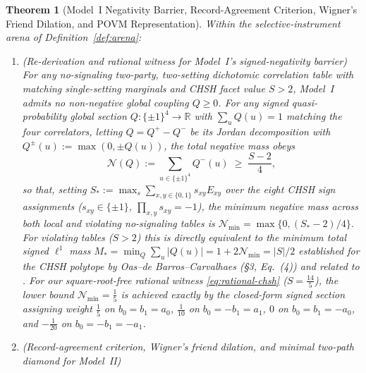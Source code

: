 \documentclass[11pt,a4paper]{article}
\newtheorem{theorem}{Theorem}
\theoremstyle{definition}
\theoremstyle{remark}
\newcommand{\cN}{\mathcal{N}}
\newcommand{\bbR}{\mathbb{R}}
\newcommand{\1}{\mathbf{1}}
\begin{document}
\begin{theorem}[Model~I Negativity Barrier, Record-Agreement Criterion, Wigner's Friend Dilation, and POVM Representation]\label{thm:branching}
Within the selective-instrument arena of Definition~\ref{def:arena}:
\begin{enumerate}
  \item[(a)] \emph{(Re-derivation and rational witness for Model~I's signed-negativity barrier)} For any no-signaling two-party, two-setting dichotomic correlation table with matching single-setting marginals and CHSH facet value $S>2$, Model~I admits no non-negative global coupling $Q\ge 0$. For any signed quasi-probability global section $Q:\{\pm 1\}^4\to\bbR$ with $\sum_u Q(u)=1$ matching the four correlators, letting $Q=Q^+-Q^-$ be its Jordan decomposition with $Q^\pm(u):=\max(0,\pm Q(u))$, the total negative mass obeys
  \begin{equation}\label{eq:negativity-bound}
    \cN(Q) := \sum_{u\in\{\pm 1\}^4} Q^-(u) \;\ge\; \frac{S - 2}{4},
  \end{equation}
  so that, setting $S_* := \max_s \sum_{x,y\in\{0,1\}} s_{xy} E_{xy}$ over the eight CHSH sign assignments ($s_{xy}\in\{\pm 1\}$, $\prod_{x,y}s_{xy}=-1$), the minimum negative mass across both local and violating no-signaling tables is $\cN_{\min} = \max\{0,(S_*-2)/4\}$. For violating tables ($S>2$) this is directly equivalent to the minimum total signed $\ell^1$ mass $M_* = \min_Q\sum_u|Q(u)| = 1+2\cN_{\min} = |S|/2$ established for the CHSH polytope by Oas--de Barros--Carvalhaes \cite{Oas2014} (\S3, Eq.~(4)) and related to \cite{Morris2022}. For our square-root-free rational witness \eqref{eq:rational-chsh} ($S=\frac{14}{5}$), the lower bound $\cN_{\min}=\frac{1}{5}$ is achieved exactly by the closed-form signed section assigning weight $\frac{1}{5}$ on $b_0=b_1=a_0$, $\frac{1}{10}$ on $b_0=-b_1=a_1$, $0$ on $b_0=b_1=-a_0$, and $-\frac{1}{20}$ on $b_0=-b_1=-a_1$.
  \item[(b)] \emph{(Record-agreement criterion, Wigner's friend dilation, and minimal two-path diamond for Model~II)}
  \begin{enumerate}

\end{enumerate}
\end{enumerate}
\end{theorem}
\end{document}
